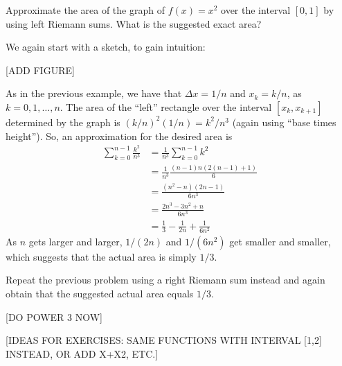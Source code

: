 \documentclass[nooutcomes]{ximera}
\begin{document}
\begin{example}
  Approximate the area of the graph of $f(x) = x^2$ over the interval $[0,1]$ by using left Riemann sums. What is the suggested exact area?

  \begin{explanation}
    We again start with a sketch, to gain intuition:

    [ADD FIGURE]

    As in the previous example, we have that $\Delta x = 1/n$ and $x_k = k/n$, as $k=0,1,\ldots, n$. The area of the ``left'' rectangle over the interval $[x_k,x_{k+1}]$ determined by the graph is $(k/n)^2(1/n) = k^2/n^3$ (again using ``base times height''). So, an approximation for the desired area is
    \begin{align*}
      \sum_{k=0}^{n-1}\frac{k^2}{n^3} &= \frac{1}{n^3}\sum_{k=0}^{n-1} k^2 \\ &= \frac{1}{n^3} \frac{(n-1)n(2(n-1)+1)}{6} \\ &= \frac{(n^2-n)(2n-1)}{6n^3} \\ &= \frac{2n^3 - 3n^2+n}{6n^3} \\ &= \frac{1}{3} -\frac{1}{2n} + \frac{1}{6n^2}
    \end{align*}
As $n$ gets larger and larger, $1/(2n)$ and $1/(6n^2)$ get smaller and smaller, which suggests that the actual area is simply $1/3$.
  \end{explanation}
\end{example}

\begin{exploration}
  Repeat the previous problem using a right Riemann sum instead and again obtain that the suggested actual area equals $1/3$.
\end{exploration}

[DO POWER 3 NOW]


[IDEAS FOR EXERCISES: SAME FUNCTIONS WITH INTERVAL [1,2] INSTEAD, OR ADD X+X2, ETC.]
\end{document}
